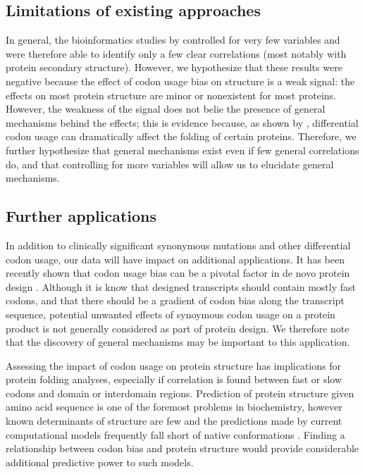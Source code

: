 \documentclass[11pt]{nih}
\begin{document}
\subsection{Limitations of existing approaches}

In general, the bioinformatics studies by \citet{Saunders2010,Biro2006,Adzhubei1996,Gu2003} controlled for very few variables and were therefore able to identify only a few clear correlations (most notably with protein secondary structure). However, we hypothesize that these results were negative because the effect of codon usage bias on structure is a weak signal: the effects on most protein structure are minor or nonexistent for most proteins. However, the weakness of the signal does not belie the presence of general mechanisms behind the effects; this is evidence because, as shown by \citet{Zhou2013,Sarfaty2007,Crombie1994}, differential codon usage can dramatically affect the folding of certain proteins. Therefore, we further hypothesize that general mechanisms exist even if few general correlations do, and that controlling for more variables will allow us to elucidate general mechanisms.

\subsection{Further applications}
In addition to clinically significant synonymous mutations and other differential codon usage, our data will have impact on additional applications. It has been recently shown that codon usage bias can be a pivotal factor in de novo protein design \citep{gustafsson2004codon}. Although it is know that designed transcripts should contain mostly fast codons, and that there should be a gradient of codon bias along the transcript sequence, potential unwanted effects of synoymous codon usage on a protein product is not generally considered as part of protein design. We therefore note that the discovery of general mechanisms may be important to this application.

Assessing the impact of codon usage on protein structure has implications for protein folding analyses, especially if correlation is found between fast or slow codons and domain or interdomain regions. Prediction of protein structure given amino acid sequence is one of the foremost problems in biochemistry, however known determinants of structure are few \citep{bryngelson1995funnels} and the predictions made by current computational models frequently fall short of native conformations \citep{das2011four,shell2009blind}. Finding a relationship between codon bias and protein structure would provide considerable additional predictive power to such models.
\end{document}
